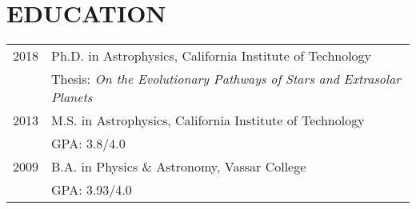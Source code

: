 \section{\large EDUCATION}

\begin{tabular}{ll}
2018 & {\sc Ph.D. in Astrophysics, California Institute of Technology}\\
& \hspace{4pt} Thesis: {\em On the Evolutionary Pathways of Stars and Extrasolar Planets}\\
2013 & {\sc M.S. in Astrophysics, California Institute of Technology}\\
& \hspace{4pt} GPA: 3.8/4.0\\
2009 & {\sc B.A. in Physics \& Astronomy, Vassar College}\\
& \hspace{4pt} GPA: 3.93/4.0\\
\end{tabular}